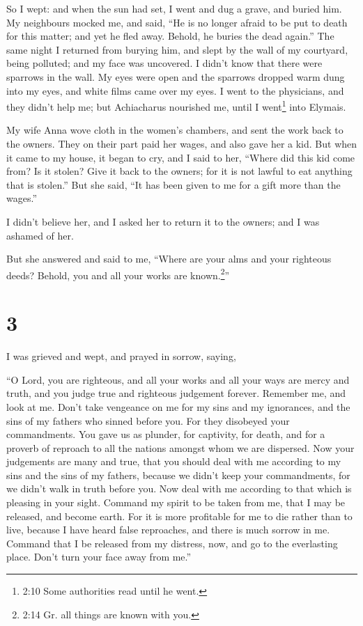  So I wept: and when the sun had set, I went and dug a
grave, and buried him.  My neighbours mocked me, and said,
``He is no longer afraid to be put to death for this matter; and yet he
fled away. Behold, he buries the dead again.''  The same
night I returned from burying him, and slept by the wall of my
courtyard, being polluted; and my face was uncovered.  I
didn't know that there were sparrows in the wall. My eyes were open and
the sparrows dropped warm dung into my eyes, and white films came over
my eyes. I went to the physicians, and they didn't help me; but
Achiacharus nourished me, until I went\footnote{2:10 Some authorities
  read until he went.} into Elymais.

 My wife Anna wove cloth in the women's chambers,
 and sent the work back to the owners. They on their part
paid her wages, and also gave her a kid.  But when it came
to my house, it began to cry, and I said to her, ``Where did this kid
come from? Is it stolen? Give it back to the owners; for it is not
lawful to eat anything that is stolen.''  But she said,
``It has been given to me for a gift more than the wages.''

I didn't believe her, and I asked her to return it to the owners; and I
was ashamed of her.

But she answered and said to me, ``Where are your alms and your
righteous deeds? Behold, you and all your works are known.\footnote{2:14
  Gr. all things are known with you.}''

\hypertarget{section-2}{%
\section{3}\label{section-2}}

 I was grieved and wept, and prayed in sorrow, saying,

 ``O Lord, you are righteous, and all your works and all
your ways are mercy and truth, and you judge true and righteous
judgement forever.  Remember me, and look at me. Don't take
vengeance on me for my sins and my ignorances, and the sins of my
fathers who sinned before you.  For they disobeyed your
commandments. You gave us as plunder, for captivity, for death, and for
a proverb of reproach to all the nations amongst whom we are dispersed.
 Now your judgements are many and true, that you should deal
with me according to my sins and the sins of my fathers, because we
didn't keep your commandments, for we didn't walk in truth before you.
 Now deal with me according to that which is pleasing in
your sight. Command my spirit to be taken from me, that I may be
released, and become earth. For it is more profitable for me to die
rather than to live, because I have heard false reproaches, and there is
much sorrow in me. Command that I be released from my distress, now, and
go to the everlasting place. Don't turn your face away from me.''

